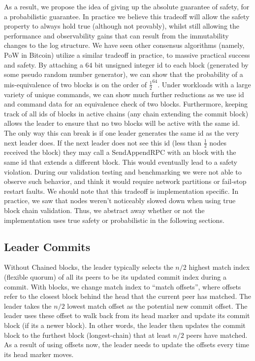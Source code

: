 As a result, we propose the idea of giving up the absolute guarantee of safety, for a probabilistic guarantee. 
In practice we believe this tradeoff will allow the safety property to always hold true (although not provably), whilst still allowing the performance and observability gains that can result from the immutability changes to the log structure. 
We have seen other consensus algorithms (namely, PoW in Bitcoin\cite{nakamoto2012bitcoin}) utilize a similar tradeoff in practice, to massive practical success and safety.
By attaching a $64$ bit unsigned integer id to each block (generated by some pseudo random number generator), we can show that the probability of a mis-equivalence of two blocks is on the order of $\frac{1}{2}^{64}$. 
Under workloads with a large variety of unique commands, we can show much further reductions as we use id and command data for an equivalence check of two blocks. 
Furthermore, keeping track of all ids of blocks in active chains (any chain extending the commit block) allows the leader to ensure that no two blocks will be active with the same id.
The only way this can break is if one leader generates the same id as the very next leader does. 
If the next leader does not see this id (less than $\frac{1}{2}$ nodes received the block) they may call a SendAppendRPC with an block with the same id that extends a different block. 
This would eventually lead to a safety violation. During our validation testing and benchmarking we were not able to observe such behavior, and think it would require network partitions or fail-stop restart faults.
We should note that this tradeoff is implementation specific. 
In practice, we saw that nodes weren't noticeably slowed down when using true block chain validation. Thus, we abstract away whether or not the implementation uses true safety or probabilistic in the following sections.

\subsection{Leader Commits}
Without Chained blocks, the leader typically selects the $n/2$ highest match index (flexible quorum) of all its peers to be its updated commit index during a commit. 
With blocks, we change match index to “match offsets”, where offsets refer to the closest block behind the head that the current peer has matched. 
The leader takes the $n/2$ lowest match offset as the potential new commit offset. The leader uses these offset to walk back from its head marker and update its commit block (if its a newer block). 
In other words, the leader then updates the commit block to the furthest block (longest-chain) that at least $n/2$ peers have matched. 
As a result of using offsets now, the leader needs to update the offsets every time its head marker moves.

